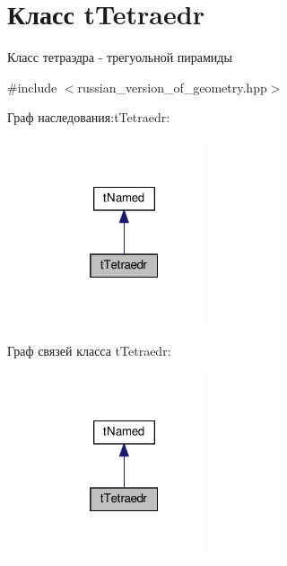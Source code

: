 \hypertarget{classtTetraedr}{}\section{Класс t\+Tetraedr}
\label{classtTetraedr}


Класс тетраэдра -\/ трегуольной пирамиды  




{\ttfamily \#include $<$russian\+\_\+version\+\_\+of\+\_\+geometry.\+hpp$>$}



Граф наследования\+:t\+Tetraedr\+:\nopagebreak
\begin{figure}[H]
\begin{center}
\leavevmode
\includegraphics[width=136pt]{classtTetraedr__inherit__graph}
\end{center}
\end{figure}


Граф связей класса t\+Tetraedr\+:\nopagebreak
\begin{figure}[H]
\begin{center}
\leavevmode
\includegraphics[width=136pt]{classtTetraedr__coll__graph}
\end{center}
\end{figure}

